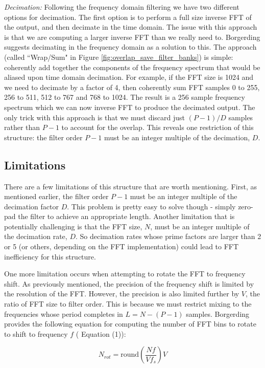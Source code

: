 \documentclass[12pt]{article}
\begin{document}
\emph{Decimation:} Following the frequency domain filtering we have two
different options for decimation. The first option is to perform a full size
inverse FFT of the output, and then decimate in the time domain. The issue with
this approach is that we are computing a larger inverse FFT than we really need
to. Borgerding suggests decimating in the frequency domain as a solution to this.
The approach (called ``Wrap/Sum" in Figure
\ref{fig:overlap_save_filter_banks}) is simple: coherently add together the
components of the frequency spectrum that would be aliased upon time domain
decimation. For example, if the FFT size is 1024 and we need to decimate by
a factor of 4, then coherently sum FFT samples 0 to 255, 256 to 511, 512 to 
767 and 768 to 1024.  The result is a 256 sample frequency
spectrum which we can now inverse FFT to produce the decimated output. The
only trick with this approach is that we must discard just $(P-1)/D$
samples rather than $P-1$ to account for the overlap.  This reveals one
restriction of this structure: the filter order $P-1$ must be an integer
multiple of the decimation, $D$.

\subsection{Limitations}
\label{sec:os_limitations}
There are a few limitations of this structure that are worth mentioning. First,
as mentioned earlier, the filter order $P-1$ must be an integer multiple of the
decimation factor $D$. This problem is pretty easy to solve though - simply
zero-pad the filter to achieve an appropriate length. Another limitation that
is potentially challenging is that the FFT size, $N$, must be an integer
multiple of the decimation rate, $D$. So decimation rates whose prime factors
are larger than 2 or 5 (or others, depending on the FFT implementation) could
lead to FFT inefficiency for this structure.

One more limitation occurs when attempting to rotate the FFT to frequency
shift.  As previously mentioned, the precision of the frequency shift is
limited by the resolution of the FFT. However, the precision is also limited
further by $V$, the ratio of FFT size to filter order. This is because we must
restrict mixing to the frequencies whose period completes in $L=N-(P-1)$
samples. Borgerding provides the following equation for computing the number of
FFT bins to rotate to shift to frequency $f$ (\cite{Borgerding1} Equation (1)):

\begin{equation}
    N_{rot} = \text{round}\left( \frac{Nf}{Vf_s} \right) V
\end{equation}
\end{document}
